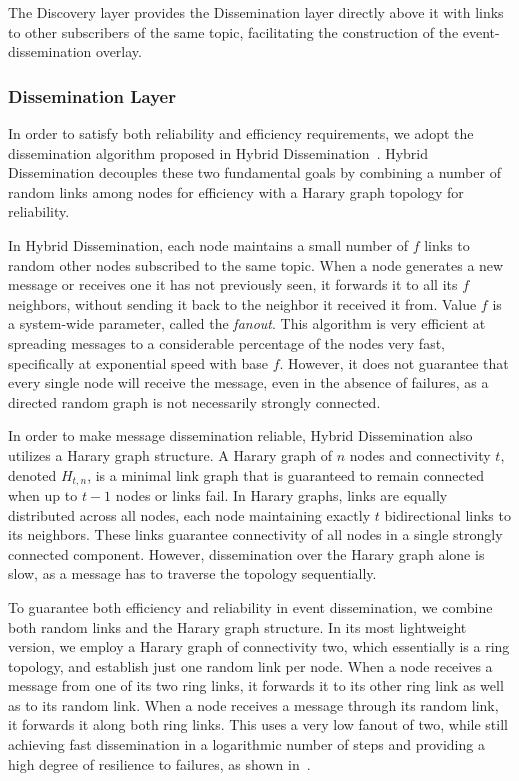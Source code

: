 The Discovery layer provides the Dissemination layer directly above it with links to other subscribers of the same topic, facilitating the construction of the event-dissemination overlay.

\subsubsection{Dissemination Layer}

In order to satisfy both reliability and efficiency requirements, we adopt the dissemination algorithm proposed in Hybrid Dissemination~\cite{HybridDissemination}.
Hybrid Dissemination decouples these two fundamental goals by combining a number of random links among nodes for efficiency with a Harary graph
topology for reliability.

In Hybrid Dissemination, each node maintains a small number of $f$ links to random other nodes subscribed to the same topic.
When a node generates a new message or receives one it has not previously seen, it forwards it to all its $f$ neighbors, without
sending it back to the neighbor it received it from.
Value $f$ is a system-wide parameter, called the \emph{fanout}.
This algorithm is very efficient at spreading messages to a considerable percentage of the nodes very fast, specifically at exponential
speed with base $f$.
However, it does not guarantee that every single node will receive the message, even in the absence of failures, as a directed random graph is not necessarily strongly connected.

In order to make message dissemination reliable, Hybrid Dissemination also utilizes a Harary graph structure.
A Harary graph of $n$ nodes and connectivity $t$, denoted   $H_{t,n}$, is a minimal link graph that is guaranteed to remain connected when up to $t-1$ nodes or links fail.
In Harary graphs, links are equally distributed across all nodes, each node maintaining exactly $t$ bidirectional links to its neighbors.
These links guarantee connectivity of all nodes in a single strongly connected component.
However, dissemination over the Harary graph alone is slow, as a message has to traverse the topology sequentially.

To guarantee both efficiency and reliability in event dissemination, we combine both random links and the Harary graph structure.
In its most lightweight version, we employ a Harary graph of connectivity two, which essentially is a ring topology, and establish just one random link per node.
When a node receives a message from one of its two ring links, it forwards it to its other ring link as well as to its random link.
When a node receives a message through its random link, it forwards it along both ring links.
This uses a very low   fanout of two, while still achieving fast dissemination in a logarithmic number of steps and providing a high degree of resilience to failures, as shown in~\cite{HybridDissemination}.


